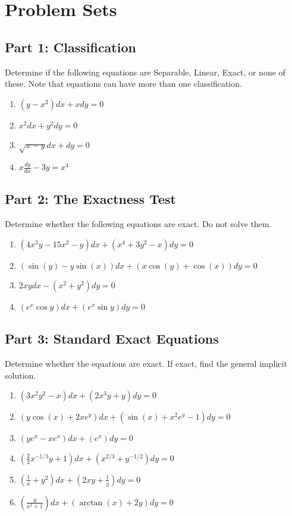 \documentclass[11pt]{article}
\begin{document}
\newpage

\section{Problem Sets}

\subsection*{Part 1: Classification}
Determine if the following equations are Separable, Linear, Exact, or none of these. Note that equations can have more than one classification.
\begin{enumerate}[label=\textbf{\arabic*.}]
    \item $(y - x^2)dx + x dy = 0$
    \item $x^2 dx + y^2 dy = 0$
    \item $\sqrt{x-y} dx + dy = 0$
    \item $x \frac{dy}{dx} - 3y = x^4$
\end{enumerate}

\subsection*{Part 2: The Exactness Test}
Determine whether the following equations are exact. Do not solve them.
\begin{enumerate}[label=\textbf{\arabic*.}, resume]
    \item $(4x^3 y - 15x^2 - y)dx + (x^4 + 3y^2 - x)dy = 0$
    \item $(\sin(y) - y \sin(x))dx + (x \cos(y) + \cos(x))dy = 0$
    \item $2xydx - (x^2 + y^2)dy = 0$
    \item $(e^x \cos y)dx + (e^x \sin y)dy = 0$
\end{enumerate}

\subsection*{Part 3: Standard Exact Equations}
Determine whether the equations are exact. If exact, find the general implicit solution.
\begin{enumerate}[label=\textbf{\arabic*.}, resume]
    \item $(3x^2 y^2 - x)dx + (2x^3 y + y)dy = 0$
    \item $(y \cos(x) + 2xe^y)dx + (\sin(x) + x^2 e^y - 1)dy = 0$
    \item $(y e^x - x e^x)dx + (e^x)dy = 0$
    \item $(\frac{2}{3}x^{-1/3} y + 1)dx + (x^{2/3} + y^{-1/2})dy = 0$
    \item $(\frac{1}{x} + y^2)dx + (2xy + \frac{1}{y})dy = 0$
    \item $(\frac{y}{x^2+1})dx + (\arctan(x) + 2y)dy = 0$
\end{enumerate}
\end{document}
